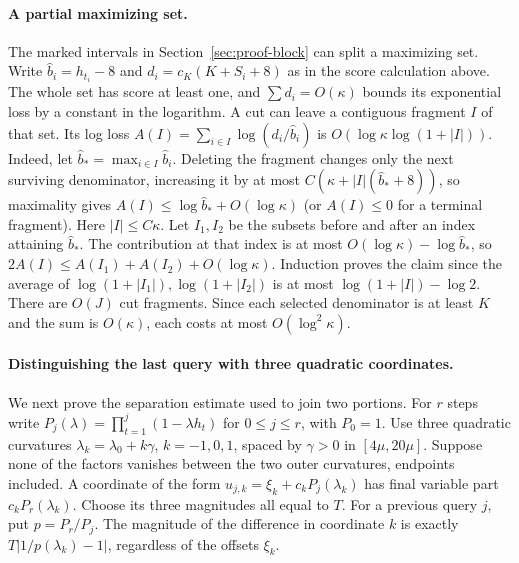 \documentclass[11pt]{article}
\theoremstyle{definition}
\begin{document}
\paragraph{A partial maximizing set.}
The marked intervals in Section~\ref{sec:proof-block} can split a maximizing set. Write \(\widehat b_i=h_{t_i}-8\) and \(d_i=c_K(K+S_i+8)\) as in the score calculation above. The whole set has score
at least one, and \(\sum d_i=O(\kappa)\) bounds its exponential loss by
a constant in the logarithm. A cut can leave a contiguous fragment
\(I\) of that set. Its log loss \(A(I)=\sum_{i\in I}\log(d_i/\widehat b_i)\)
is \(O(\log\kappa\log(1+|I|))\). Indeed, let \(\widehat b_*=\max_{i\in I}\widehat b_i\).
Deleting the fragment changes only the next surviving denominator,
increasing it by at most \(C(\kappa+|I|(\widehat b_*+8))\), so maximality
gives \(A(I)\le\log \widehat b_*+O(\log\kappa)\) (or \(A(I)\le0\) for a
terminal fragment). Here \(|I|\le C\kappa\). Let \(I_1,I_2\) be the
subsets before and after an index attaining \(\widehat b_*\). The contribution at
that index is at most \(O(\log\kappa)-\log \widehat b_*\), so
\(2A(I)\le A(I_1)+A(I_2)+O(\log\kappa)\). Induction proves the
claim since the average of \(\log(1+|I_1|),\log(1+|I_2|)\) is
at most \(\log(1+|I|)-\log2\). There are \(O(J)\) cut fragments. Since each selected denominator is at least \(K\) and the sum is \(O(\kappa)\), each costs at most \(O(\log^2\kappa)\).

\paragraph{Distinguishing the last query with three quadratic coordinates.}\label{app:spectral}
We next prove the separation estimate used to join two portions. For \(r\) steps write \(P_j(\lambda)=\prod_{t=1}^j(1-\lambda h_t)\) for
\(0\le j\le r\), with \(P_0=1\). Use three quadratic curvatures
\(\lambda_k=\lambda_0+k\gamma\), \(k=-1,0,1\), spaced by \(\gamma>0\) in
\([4\mu,20\mu]\). Suppose none of the factors vanishes between the two
outer curvatures, endpoints included. A coordinate of the form
\(u_{j,k}=\xi_k+c_k P_j(\lambda_k)\) has final variable part
\(c_kP_r(\lambda_k)\). Choose its three magnitudes all equal to \(T\).
For a previous query \(j\), put \(p=P_r/P_j\). The magnitude of
the difference in coordinate \(k\) is exactly
\(T|1/p(\lambda_k)-1|\), regardless of the offsets \(\xi_k\).
\end{document}
